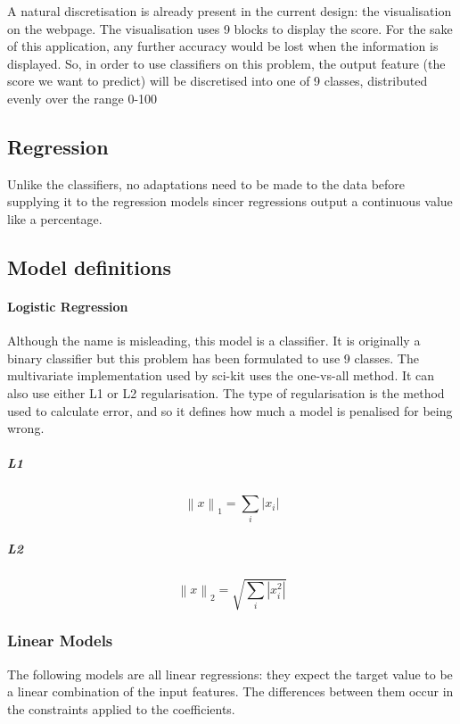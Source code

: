 A natural discretisation is already present in the current design: the visualisation on the webpage. The visualisation uses 9 blocks to display the score. For the sake of this application, any further accuracy would be lost when the information is displayed. So, in order to use classifiers on this problem, the output feature (the score we want to predict) will be discretised into one of 9 classes, distributed evenly over the range 0-100%

\subsection{Regression}
Unlike the classifiers, no adaptations need to be made to the data before supplying it to the regression models sincer regressions output a continuous value like a percentage.

\subsection{Model definitions}

\paragraph*{Logistic Regression}
Although the name is misleading, this model is a classifier. It is originally a binary classifier but this problem has been formulated to use 9 classes. The multivariate implementation used by sci-kit uses the one-vs-all method. It can also use either L1 or L2 regularisation. The type of regularisation is the method used to calculate error, and so it defines how much a model is penalised for being wrong.
\subparagraph*{L1}
\begin{displaymath}
\left \|x  \right \|_{1} = \sum_{i}^{ } \left |x_{i}\right |
\end{displaymath}

\subparagraph*{L2}
\begin{displaymath}
\left \|x  \right \|_{2} = \sqrt{\sum_{i} \left |x^{2}_{i}\right |}
\end{displaymath}

\subsubsection{Linear Models}
The following models are all linear regressions: they expect the target value to be a linear combination of the input features. The differences between them occur in the constraints applied to the coefficients.

